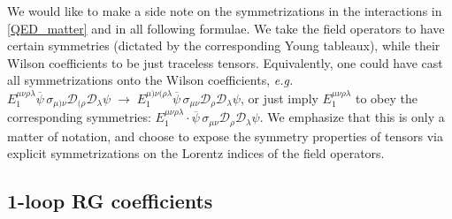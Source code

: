 \documentclass[12pt,preprintnumbers,nofootinbib]{revtex4}
\newcommand{\wt}{\widetilde}
\newcommand{\ov}{\overline}
\begin{document}
	We would like to make a side note on the symmetrizations in the 
	interactions in \eqref{QED_matter} and in all following formulae.
	We take the field operators to have certain symmetries 
	(dictated by the corresponding Young tableaux), while their Wilson
	coefficients to be just traceless tensors. 
	Equivalently, one could have cast all symmetrizations onto the
	Wilson coefficients, {\it e.g.}
$	E_1^{\mu\nu\rho\lambda}
	\ov{\psi}\, \sigma_{\mu)\nu} \mathcal{D}_{(\rho}\mathcal{D}_\lambda 
	\psi 
	\;\to\;
	E_1^{\mu)\nu(\rho\lambda}
	\ov{\psi}\, \sigma_{\mu\nu} \mathcal{D}_{\rho}\mathcal{D}_\lambda 
	\psi $,
	or just imply $ E_1^{\mu\nu\rho\lambda} $ to obey the corresponding
	symmetries: 
$	E_1^{\mu\nu\rho\lambda}\cdot
	\ov{\psi}\, \sigma_{\mu\nu} \mathcal{D}_{\rho}\mathcal{D}_\lambda 
	\psi $.
	We emphasize that this is only a matter of notation, and choose
	to expose the symmetry properties of tensors via explicit 
	symmetrizations on the Lorentz indices of the field operators.


\subsection{1-loop RG coefficients}
\end{document}
